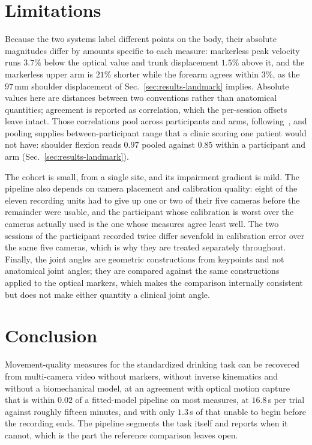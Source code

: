 \documentclass[conference]{IEEEtran}
\begin{document}
\section{Limitations}
\label{sec:limitations}
Because the two systems label different points on the body, their absolute
magnitudes differ by amounts specific to each measure: markerless peak velocity
runs $3.7\%$ below the optical value and trunk displacement $1.5\%$ above it,
and the markerless upper arm is $21\%$ shorter while the forearm agrees within
$3\%$, as the $97$\,mm shoulder displacement of
Sec.~\ref{sec:results-landmark} implies. Absolute values here are distances
between two conventions rather than anatomical quantities; agreement is reported
as correlation, which the per-session offsets leave intact. Those correlations
pool across participants and arms, following~\cite{unger2024}, and pooling
supplies between-participant range that a clinic scoring one patient would not
have: shoulder flexion reads $0.97$ pooled against $0.85$ within a participant
and arm (Sec.~\ref{sec:results-landmark}).

The cohort is small, from a single site, and its impairment gradient is mild.
The pipeline also depends on camera placement and calibration quality: eight of
the eleven recording units had to give up one or two of their five cameras
before the remainder were usable, and the participant whose calibration is worst
over the cameras actually used is the one whose measures agree least well. The
two sessions of the participant recorded twice differ sevenfold in calibration
error over the same five cameras, which is why they are treated separately
throughout. Finally, the joint angles are
geometric constructions from keypoints and not anatomical joint angles; they are
compared against the same constructions applied to the optical markers, which
makes the comparison internally consistent but does not make either quantity a
clinical joint angle.

\section{Conclusion}
Movement-quality measures for the standardized drinking task can be recovered
from multi-camera video without markers, without inverse kinematics and without
a biomechanical model, at an agreement with optical motion capture that is
within $0.02$ of a fitted-model pipeline on most measures, at $16.8$\,s per
trial against roughly fifteen minutes, and with only $1.3$\,s of that unable to
begin before the recording ends. The pipeline segments the task itself and reports when
it cannot, which is the part the reference comparison leaves open.
\end{document}
